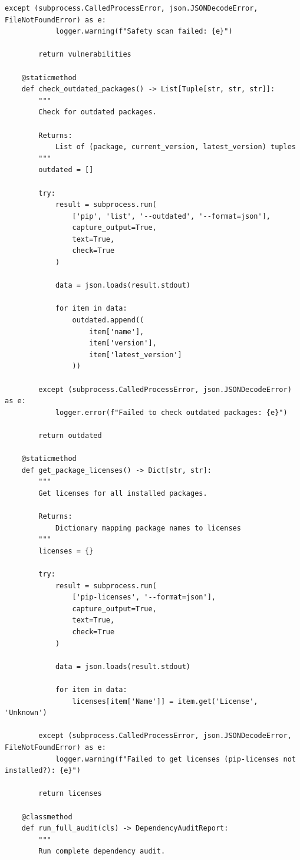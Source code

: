 \begin{lstlisting}[style=python, caption={Dependency auditing and vulnerability scanning}]
        except (subprocess.CalledProcessError, json.JSONDecodeError, FileNotFoundError) as e:
            logger.warning(f"Safety scan failed: {e}")

        return vulnerabilities

    @staticmethod
    def check_outdated_packages() -> List[Tuple[str, str, str]]:
        """
        Check for outdated packages.

        Returns:
            List of (package, current_version, latest_version) tuples
        """
        outdated = []

        try:
            result = subprocess.run(
                ['pip', 'list', '--outdated', '--format=json'],
                capture_output=True,
                text=True,
                check=True
            )

            data = json.loads(result.stdout)

            for item in data:
                outdated.append((
                    item['name'],
                    item['version'],
                    item['latest_version']
                ))

        except (subprocess.CalledProcessError, json.JSONDecodeError) as e:
            logger.error(f"Failed to check outdated packages: {e}")

        return outdated

    @staticmethod
    def get_package_licenses() -> Dict[str, str]:
        """
        Get licenses for all installed packages.

        Returns:
            Dictionary mapping package names to licenses
        """
        licenses = {}

        try:
            result = subprocess.run(
                ['pip-licenses', '--format=json'],
                capture_output=True,
                text=True,
                check=True
            )

            data = json.loads(result.stdout)

            for item in data:
                licenses[item['Name']] = item.get('License', 'Unknown')

        except (subprocess.CalledProcessError, json.JSONDecodeError, FileNotFoundError) as e:
            logger.warning(f"Failed to get licenses (pip-licenses not installed?): {e}")

        return licenses

    @classmethod
    def run_full_audit(cls) -> DependencyAuditReport:
        """
        Run complete dependency audit.


\end{lstlisting}
